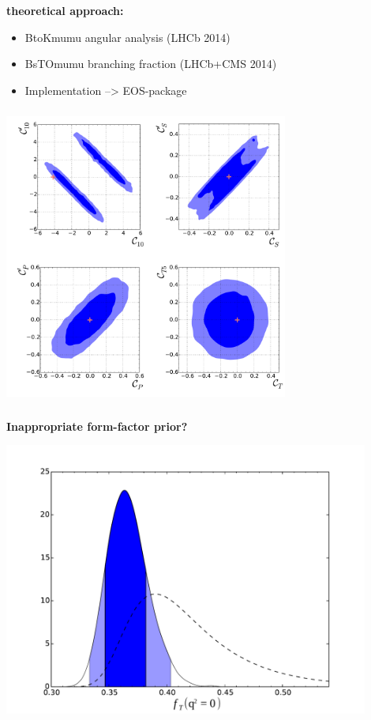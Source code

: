 \documentclass[english]{beamer}
\newcommand{\slide}[2][t]{\begin{frame}[#1] \frametitle{\insertsection} #2 \end{frame}}
\begin{document}
{    {\large\textbf{theoretical approach:}}

    \begin{itemize}
        \item BtoKmumu angular analysis (LHCb 2014) %
        \item BsTOmumu branching fraction (LHCb+CMS 2014) %
        \item Implementation --> EOS-package
    \end{itemize}


}

\slide{

    \frametitle{\insertsubsectionhead}

    \begin{center}
        \includegraphics[width=0.7\textwidth]{figures/Wilson_coeff_2d}
    \end{center}

}

\slide[t]{

    \frametitle{\insertsubsectionhead}

    {\large\textbf{Inappropriate form-factor prior?}}

    \begin{center}
        \includegraphics[width=0.9\textwidth]{figures/FF_ft0}
    \end{center}

}
\end{document}
